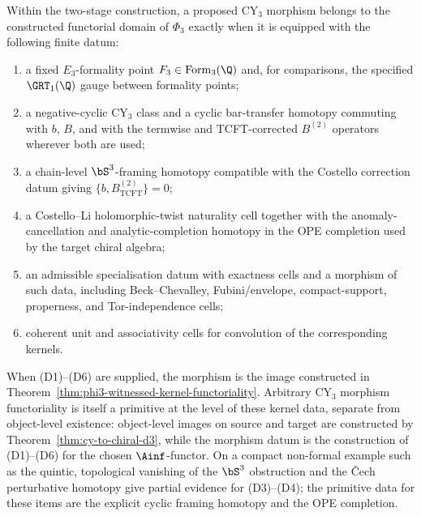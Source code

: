 \begin{corollary}
\label{cor:cya3-finite-witness-package}
Within the two-stage construction, a proposed
CY$_3$ morphism belongs to the constructed functorial domain of
$\Phi_3$ exactly when it is equipped with the following finite
datum:
\begin{enumerate}[label=\textup{(D\arabic*)}]
 \item a fixed $E_3$-formality point $F_3\in\mathrm{Form}_3(\Q)$ and,
 for comparisons, the specified $\GRT_1(\Q)$ gauge between formality
 points;
 \item a negative-cyclic CY$_3$ class and a cyclic bar-transfer
 homotopy commuting with $b$, $B$, and with the termwise and
 TCFT-corrected $B^{(2)}$ operators wherever both are used;
 \item a chain-level $\bS^3$-framing homotopy compatible with the
 Costello correction datum giving
 $\{b,B^{(2)}_{\mathrm{TCFT}}\}=0$;
 \item a Costello--Li holomorphic-twist naturality cell together with
 the anomaly-cancellation and analytic-completion homotopy in the OPE
 completion used by the target chiral algebra;
 \item an admissible specialisation datum with exactness cells and a morphism of
 such data, including Beck--Chevalley, Fubini/envelope,
 compact-support, properness, and Tor-independence cells;
 \item coherent unit and associativity cells for convolution of the
 corresponding kernels.
\end{enumerate}
When \textup{(D1)--(D6)} are supplied, the morphism is the image
constructed in
Theorem~\ref{thm:phi3-witnessed-kernel-functoriality}. Arbitrary
CY$_3$ morphism functoriality is itself a primitive at the level of
these kernel data, separate from object-level existence: object-level
images on source and target are constructed by
Theorem~\ref{thm:cy-to-chiral-d3}, while the morphism datum is the
construction of \textup{(D1)--(D6)} for the chosen $\Ainf$-functor.
On a compact non-formal example such as the quintic, topological
vanishing of the $\bS^3$ obstruction and the \v{C}ech perturbative
homotopy give partial evidence for \textup{(D3)--(D4)}; the primitive
data for these items are the explicit cyclic framing homotopy and
the OPE completion.
\end{corollary}

